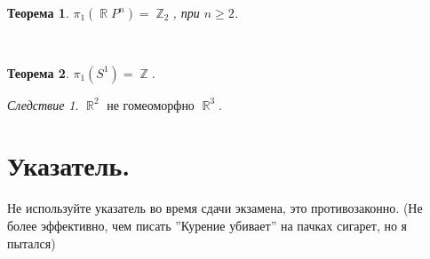 \documentclass[a4paper,100pt]{article}
\theoremstyle{indented}
\newtheorem{theorem}{Теорема}
\theoremstyle{definition}
\theoremstyle{remark}
\newtheorem{cons}{Следствие}
\DeclareMathOperator{\ZZ}{\mathbb{Z}}
\DeclareMathOperator{\RR}{\mathbb{R}}
\begin{document}
\begin{theorem}
    $\pi_1(\RR P^n) = \ZZ_2$, при $n \geq 2$.
\end{theorem} \ 

\begin{theorem}
    $\pi_1(S^1) = \ZZ$.
\end{theorem}

\begin{cons}
    $\RR^2$ не гомеоморфно $\RR^3$. 
\end{cons}

\newpage

\section{Указатель.}

\hypertarget{t2}{Не используйте указатель во время сдачи экзамена, это противозаконно. (Не более эффективно, чем писать ''Курение убивает'' на пачках сигарет, но я пытался)}
\end{document}
